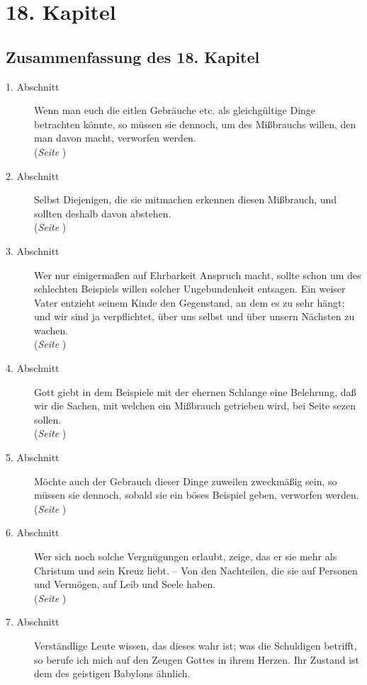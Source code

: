 
\chapter{18. Kapitel} \label{kap18}
\section{Zusammenfassung des 18. Kapitel}
\footnotesize
\begin{description}
\item[1. Abschnitt] Wenn man euch die eitlen Gebräuche etc. als gleichgültige
Dinge betrachten könnte, so müssen sie dennoch, um des Mißbrauchs willen, den
man davon macht, verworfen werden.
\\(\textit{Seite \pageref{kap18_ab1}})
\item[2. Abschnitt] Selbst Diejenigen, die sie mitmachen erkennen diesen
Mißbrauch, und sollten deshalb davon abstehen.
\\(\textit{Seite \pageref{kap18_ab2}})
\item[3. Abschnitt] Wer nur einigermaßen auf Ehrbarkeit Anspruch macht, sollte
schon um des schlechten Beispiels willen solcher Ungebundenheit entsagen. Ein
weiser Vater entzieht seinem Kinde den Gegenstand, an dem es zu sehr hängt; und
wir sind ja verpflichtet, über uns selbst und über unsern Nächsten zu wachen.
\\(\textit{Seite \pageref{kap18_ab3}})
\item[4. Abschnitt] Gott giebt in dem Beispiele mit der ehernen Schlange eine
Belehrung, daß wir die Sachen, mit welchen ein Mißbrauch getrieben wird, bei
Seite sezen sollen.
\\(\textit{Seite \pageref{kap18_ab4}})
\item[5. Abschnitt] Möchte auch der Gebrauch dieser Dinge zuweilen zweckmäßig
sein, so müssen sie dennoch, sobald sie ein böses Beispiel geben, verworfen
werden.
\\(\textit{Seite \pageref{kap18_ab5}})
\item[6. Abschnitt] Wer sich noch solche Vergnügungen erlaubt, zeige, das er sie
mehr als Christum und sein Kreuz liebt. -- Von den Nachteilen, die sie auf
Personen und Vermögen, auf Leib und Seele haben.
\\(\textit{Seite \pageref{kap18_ab6}})
\item[7. Abschnitt] Verständlige Leute wissen, das dieses wahr ist; was die
Schuldigen betrifft, so berufe ich mich auf den Zeugen Gottes in ihrem Herzen.
Ihr Zustand ist dem des geistigen Babylons ähnlich.

\end{description}
